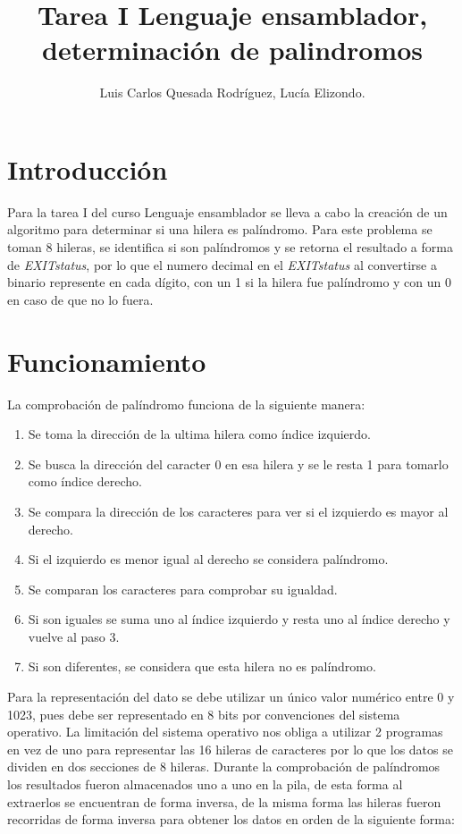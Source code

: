\documentclass[8pt,letterpapper]{article}
\begin{document}
\title{Tarea I Lenguaje ensamblador, determinación de palindromos}
\author{Luis Carlos Quesada Rodríguez, Lucía Elizondo.}

\maketitle

\section{Introducción}
Para la tarea I del curso Lenguaje ensamblador se lleva a cabo la creación de un algoritmo para determinar si una hilera es palíndromo. Para este problema se toman 8 hileras, se identifica si son palíndromos y se retorna el resultado a forma de \textit{EXIT\textunderscore status}, por lo que el numero decimal en el \textit{EXIT\textunderscore status} al convertirse a binario represente en cada dígito, con un 1 si la hilera fue palíndromo y con un 0 en caso de que no lo fuera. 

\section{Funcionamiento}
La comprobación de palíndromo funciona de la siguiente manera:
\begin{enumerate}
    \item Se toma la dirección de la ultima hilera como índice izquierdo. %
    \item Se busca la dirección del caracter 0 en esa hilera y se le resta 1 para tomarlo como índice derecho. %
    \item Se compara la dirección de los caracteres para ver si el izquierdo es mayor al derecho.    %
    \item Si el izquierdo es menor igual al derecho se considera palíndromo. %
    \item Se comparan los caracteres para comprobar su igualdad. %
    \item Si son iguales se suma uno al índice izquierdo y resta uno al índice derecho y vuelve al paso 3. %
    \item Si son diferentes, se considera que esta hilera no es palíndromo.
\end{enumerate}

Para la representación del dato se debe utilizar un único valor numérico entre 0 y 1023, pues debe ser representado en 8 bits por convenciones del sistema operativo. La limitación del sistema operativo nos obliga a utilizar 2 programas en vez de uno para representar las 16 hileras de caracteres por lo que los datos se dividen en dos secciones de 8 hileras. Durante la comprobación de palíndromos los resultados fueron almacenados uno a uno en la pila, de esta forma al extraerlos se encuentran de forma inversa, de la misma forma las hileras fueron recorridas de forma inversa para obtener los datos en orden de la siguiente forma:
\end{document}
